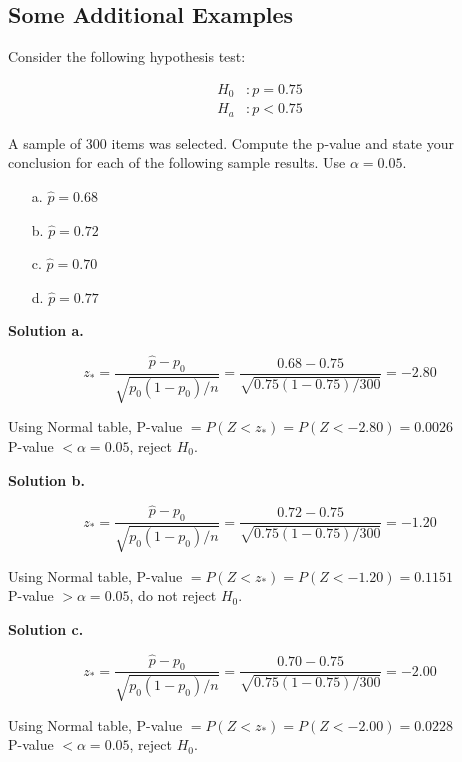\subsection*{Some Additional Examples}
\begin{example}
Consider the following hypothesis test:


\begin{align*}
H_0 &: p = 0.75 \\
H_a &: p < 0.75
\end{align*}


A sample of 300 items was selected. Compute the p-value and state your conclusion for each of the following sample results. Use $\alpha = 0.05$.

\begin{itemize}
  \item[a.] $\hat{p} = 0.68$
  \item[b.] $\hat{p} = 0.72$
  \item[c.] $\hat{p} = 0.70$
  \item[d.] $\hat{p} = 0.77$
\end{itemize}

\vspace{1em}
\textbf{Solution a.}

\[
z_* = \frac{\hat{p} - p_0}{\sqrt{p_0(1 - p_0)/n}} = \frac{0.68 - 0.75}{\sqrt{0.75(1 - 0.75)/300}} = -2.80
\]

Using Normal table, P-value $= P(Z < z_*) = P(Z < -2.80) = 0.0026$ \\
P-value $< \alpha = 0.05$, reject $H_0$.

\vspace{1em}
\textbf{Solution b.}

\[
z_* = \frac{\hat{p} - p_0}{\sqrt{p_0(1 - p_0)/n}} = \frac{0.72 - 0.75}{\sqrt{0.75(1 - 0.75)/300}} = -1.20
\]

Using Normal table, P-value $= P(Z < z_*) = P(Z < -1.20) = 0.1151$ \\
P-value $> \alpha = 0.05$, do not reject $H_0$.

\vspace{1em}
\textbf{Solution c.}

\[
z_* = \frac{\hat{p} - p_0}{\sqrt{p_0(1 - p_0)/n}} = \frac{0.70 - 0.75}{\sqrt{0.75(1 - 0.75)/300}} = -2.00
\]

Using Normal table, P-value $= P(Z < z_*) = P(Z < -2.00) = 0.0228$ \\
P-value $< \alpha = 0.05$, reject $H_0$.
\end{example}
